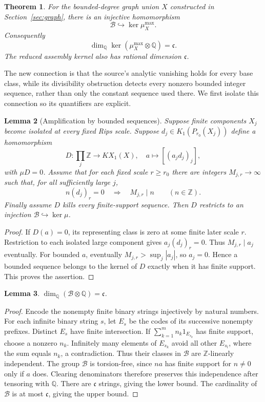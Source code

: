 \documentclass[11pt]{article}
\newtheorem{theorem}{Theorem}
\newtheorem{lemma}[theorem]{Lemma}
\theoremstyle{remark}\newtheorem{remark}[theorem]{Remark}
\newcommand{\Z}{\mathbb Z}\newcommand{\Q}{\mathbb Q}\newcommand{\R}{\mathbb R}
\newcommand{\KX}{KX}\newcommand{\KK}{\operatorname{KK}}
\newcommand{\co}{\mathfrak c}\newcommand{\id}{\operatorname{id}}
\begin{document}
\begin{theorem}\label{thm:large}
For the bounded-degree graph union $X$ constructed in Section~\ref{sec:graph},
there is an injective homomorphism
\[
 \mathcal B\hookrightarrow\ker\mu_X^{\max}.
\]
Consequently
\[
 \dim_{\Q}\ker(\mu_X^{\max}\otimes\Q)=\co.
\]
The reduced assembly kernel also has rational dimension $\co$.
\end{theorem}

The new connection is that the source's analytic vanishing holds for every
base class, while its divisibility obstruction detects every nonzero bounded
integer sequence, rather than only the constant sequence used there.
We first isolate this connection so its quantifiers are explicit.

\begin{lemma}[Amplification by bounded sequences]\label{lem:amplify}
Suppose finite components $X_j$ become isolated at every fixed Rips scale.
Suppose $d_j\in K_1(P_{r_0}(X_j))$ define a homomorphism
\[
 D:\prod_j\Z\longrightarrow\KX_1(X),\quad
 a\longmapsto[(a_jd_j)_j],
\]
with $\mu D=0$. Assume that for each fixed scale $r\geq r_0$ there are
integers $M_{j,r}\to\infty$ such that, for all sufficiently large $j$,
\[
 n(d_j)_r=0\quad\Longrightarrow\quad M_{j,r}\mid n
 \qquad(n\in\Z).
\]
Finally assume $D$ kills every finite-support sequence. Then $D$ restricts to
an injection $\mathcal B\hookrightarrow\ker\mu$.
\end{lemma}
\begin{proof}
If $D(a)=0$, its representing class is zero at some finite later scale $r$.
Restriction to each isolated large component gives $a_j(d_j)_r=0$.
Thus $M_{j,r}\mid a_j$ eventually. For bounded $a$, eventually
$M_{j,r}>\sup_j|a_j|$, so $a_j=0$. Hence a bounded sequence belongs to the
kernel of $D$ exactly when it has finite support. This proves the assertion.
\end{proof}

\begin{lemma}\label{lem:rank}
$\dim_{\Q}(\mathcal B\otimes\Q)=\co$.
\end{lemma}
\begin{proof}
Encode the nonempty finite binary strings injectively by natural numbers.
For each infinite binary string $s$, let $E_s$ be the codes of its successive
nonempty prefixes. Distinct $E_s$ have finite intersection. If
$\sum_{k=1}^m n_k1_{E_{s_k}}$ has finite support, choose a nonzero $n_k$.
Infinitely many elements of $E_{s_k}$ avoid all other $E_{s_l}$, where the
sum equals $n_k$, a contradiction. Thus their classes in $\mathcal B$ are
$\Z$-linearly independent. The group $\mathcal B$ is torsion-free, since
$na$ has finite support for $n\neq0$ only if $a$ does. Clearing denominators
therefore preserves this independence after tensoring with $\Q$. There are
$\co$ strings, giving the lower bound. The cardinality of $\mathcal B$ is at
most $\co$, giving the upper bound.
\end{proof}
\end{document}

